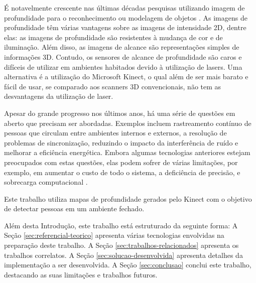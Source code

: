 É notavelmente crescente nas últimas décadas pesquisas utilizando imagem de profundidade para o reconhecimento ou modelagem de objetos \cite{sabata1993, vemuri1986}. As imagens de profundidade têm várias vantagens sobre as imagens de intensidade 2D, dentre elas: as imagens de profundidade são resistentes à mudança de cor e de iluminação. Além disso, as imagens de alcance são representações simples de informações 3D. Contudo, os sensores de alcance de profundidade são caros e difíceis de utilizar em ambientes habitados devido à utilização de lasers. Uma alternativa é a utilização do Microsoft Kinect, o qual além de ser mais barato e fácil de usar, se comparado aos scanners 3D convencionais, não tem as desvantagens da utilização de laser\cite{xia2011human}.

Apesar do grande progresso nos últimos anos, há uma série de questões em aberto que precisam ser abordadas. Exemplos incluem rastreamento contínuo de pessoas que circulam entre ambientes internos e externos, a resolução de problemas de sincronização, reduzindo o impacto da interferência de ruído e melhorar a eficiência energética. Embora algumas tecnologias anteriores estejam preocupados com estas questões, elas podem sofrer de várias limitações, por exemplo, em aumentar o custo de todo o sistema, a deficiência de precisão, e sobrecarga computacional \cite{zhang2010localization}.

Este trabalho utiliza mapas de profundidade gerados pelo Kinect com o objetivo de detectar pessoas em um ambiente fechado.

Além desta Introdução, este trabalho está estruturado da seguinte forma:
A Seção \ref{sec:referencial-teorico} apresenta várias tecnologias envolvidas na preparação deste trabalho. A Seção \ref{sec:trabalhos-relacionados} apresenta os trabalhos correlatos. A Seção \ref{sec:solucao-desenvolvida} apresenta detalhes da implementação a ser desenvolvida. A Seção \ref{sec:conclusao} conclui este trabalho, destacando as suas limitações e trabalhos futuros.